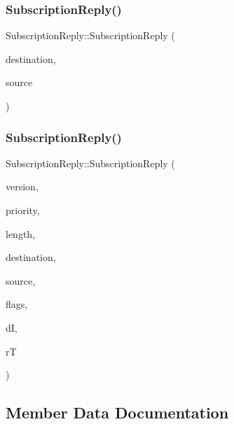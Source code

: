 \subsubsection{\texorpdfstring{Subscription\+Reply()}{SubscriptionReply()}\hspace{0.1cm}{\footnotesize\ttfamily [1/2]}}
{\footnotesize\ttfamily Subscription\+Reply\+::\+Subscription\+Reply (\begin{DoxyParamCaption}\item[{\hyperlink{structLogicalAddress}{Logical\+Address}}]{destination,  }\item[{\hyperlink{structLogicalAddress}{Logical\+Address}}]{source }\end{DoxyParamCaption})\hspace{0.3cm}{\ttfamily [inline]}}

\mbox{\label{structSubscriptionReply_a8e656028ab7b6750157b6d0ebbf06659}} 
\subsubsection{\texorpdfstring{Subscription\+Reply()}{SubscriptionReply()}\hspace{0.1cm}{\footnotesize\ttfamily [2/2]}}
{\footnotesize\ttfamily Subscription\+Reply\+::\+Subscription\+Reply (\begin{DoxyParamCaption}\item[{uint8\+\_\+t}]{version,  }\item[{uint8\+\_\+t}]{priority,  }\item[{uint16\+\_\+t}]{length,  }\item[{\hyperlink{structLogicalAddress}{Logical\+Address}}]{destination,  }\item[{\hyperlink{structLogicalAddress}{Logical\+Address}}]{source,  }\item[{uint16\+\_\+t}]{flags,  }\item[{uint16\+\_\+t}]{dI,  }\item[{uint8\+\_\+t}]{rT }\end{DoxyParamCaption})\hspace{0.3cm}{\ttfamily [inline]}}



\subsection{Member Data Documentation}
\mbox{\label{structSubscriptionReply_a8fc1a335af866ee6e1328106421fee66}} 
